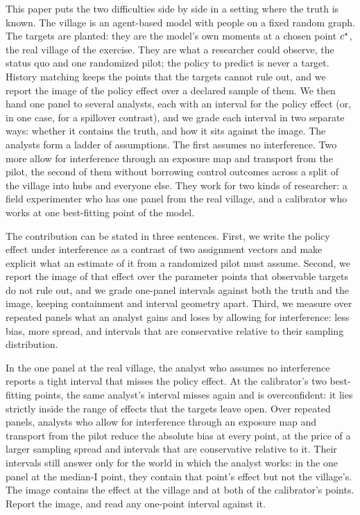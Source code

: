 This paper puts the two difficulties side by side in a setting where the truth is
known. The village is an agent-based model with \NAgents{} people on a fixed
random graph. The targets are planted: they are the model's own moments at a
chosen point $c^\star$, the real village of the exercise. They are what a
researcher could observe, the status quo and one randomized pilot; the policy to
predict is never a target. History matching keeps the points that the targets
cannot rule out, and we report the image of the policy effect over a declared
sample of them. We then hand one panel to several analysts, each with an interval
for the policy effect (or, in one case, for a spillover contrast), and we grade
each interval in two separate ways: whether it contains the truth, and how it sits
against the image. The analysts form a ladder of assumptions. The first assumes
no interference. Two more allow for interference through an exposure map and
transport from the pilot, the second of them without borrowing control outcomes
across a split of the village into hubs and everyone else. They work for two
kinds of researcher: a field experimenter who has one panel from the real village,
and a calibrator who works at one best-fitting point of the model.

The contribution can be stated in three sentences. First, we write the policy
effect under interference as a contrast of two assignment vectors and make
explicit what an estimate of it from a randomized pilot must assume. Second, we
report the image of that effect over the parameter points that observable targets
do not rule out, and we grade one-panel intervals against both the truth and the
image, keeping containment and interval geometry apart. Third, we measure over
repeated panels what an analyst gains and loses by allowing for interference:
less bias, more spread, and intervals that are conservative relative to their
sampling distribution.

\begin{statusbox}[Headline]
In the one panel at the real village, the analyst who assumes no interference
reports a tight interval that misses the policy effect. At the calibrator's two
best-fitting points, the same analyst's interval misses again and is
overconfident: it lies strictly inside the range of effects that the targets
leave open. Over repeated panels, analysts who allow for interference through an
exposure map and transport from the pilot reduce the absolute bias at every
point, at the price of a larger sampling spread and intervals that are
conservative relative to it. Their intervals still answer only for the world in
which the analyst works: in the one panel at the median-I point, they contain
that point's effect but not the village's. The image contains the effect at the
village and at both of the calibrator's points.
Report the image, and read any one-point interval against it.
\end{statusbox}


